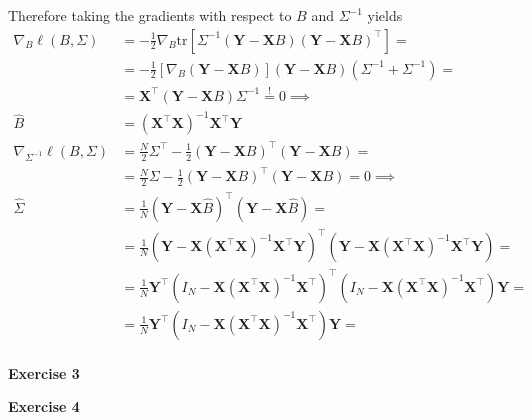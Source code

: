 \documentclass[10pt,notitlepage]{article}
\newcommand{\MBlue}[1]{{\color{MBlue}#1}}
\newcommand{\Xv}{\mathbf{X}}
\newcommand{\Yv}{\mathbf{Y}}
\newcommand{\tr}[1]{\text{tr}\left[#1\right]}
\begin{document}
\begin{exercise}[Solution]
\begin{enumerate}[(a)]
                    Therefore taking the gradients with respect to $B$ and $\Sigma^{-1}$ yields
                    \begin{align*}
                        \nabla_B \ell\left(B,\Sigma\right) &= -\frac{1}{2}\nabla_B \tr{\Sigma^{-1} \left(\Yv-\Xv B\right)\left(\Yv-\Xv B\right)^\top} = \\
                        &= -\frac{1}{2}\left[\nabla_B\left(\Yv-\Xv B\right)\right] \left(\Yv-\Xv B\right)\left(\Sigma^{-1}+\Sigma^{-1}\right) = \\
                        &= \Xv^\top\left(\Yv-\Xv B\right)\Sigma^{-1} \overset{!}{=} 0 \implies \\
                        \hat{B} &= \left(\Xv^\top\Xv\right)^{-1}\Xv^\top\Yv\\
                        \nabla_{\Sigma^{-1}} \ell\left(B,\Sigma\right) &= \frac{N}{2} \Sigma ^\top -\frac{1}{2} \left(\Yv-\Xv B\right)^\top\left(\Yv-\Xv B\right) = \\
                        &=\frac{N}{2} \Sigma -\frac{1}{2} \left(\Yv-\Xv B\right)^\top\left(\Yv-\Xv B\right) = 0\implies\\
                        \hat{\Sigma} &= \frac{1}{N}\left(\Yv-\Xv \hat{B}\right)^\top\left(\Yv-\Xv \hat{B}\right) = \\
                        &= \frac{1}{N}\left(\Yv-\Xv \left(\Xv^\top\Xv\right)^{-1}\Xv^\top\Yv\right)^\top\left(\Yv-\Xv \left(\Xv^\top\Xv\right)^{-1}\Xv^\top\Yv\right) = \\
                        &= \frac{1}{N}\Yv^\top \left(I_N - \Xv \left(\Xv^\top\Xv\right)^{-1}\Xv^\top\right)^\top\left(I_N - \Xv \left(\Xv^\top\Xv\right)^{-1}\Xv^\top\right)\Yv = \\
                        &= \frac{1}{N}\Yv^\top \left(I_N - \Xv \left(\Xv^\top\Xv\right)^{-1}\Xv^\top\right)\Yv = \\
                    \end{align*}
        \end{enumerate}
    \end{exercise}

    \newpage
    \textbf{\large \MBlue{Exercise 3}}
    \vskip10pt
    \noindent
	\begin{exercise}[Solution]

    \end{exercise}

    \newpage
    \textbf{\large \MBlue{Exercise 4}}
    \vskip10pt
    \noindent
	\begin{exercise}[Solution]

    \end{exercise}
\end{document}
